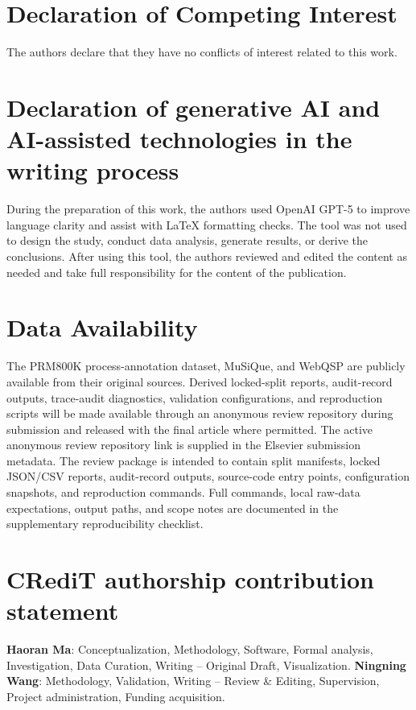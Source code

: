 \documentclass[a4paper,fleqn]{cas-sc}
\begin{document}
\section*{Declaration of Competing Interest}
The authors declare that they have no conflicts of interest related to this work.

\section*{Declaration of generative AI and AI-assisted technologies in the writing process}
During the preparation of this work, the authors used OpenAI GPT-5 to improve language clarity and assist with LaTeX formatting checks. The tool was not used to design the study, conduct data analysis, generate results, or derive the conclusions. After using this tool, the authors reviewed and edited the content as needed and take full responsibility for the content of the publication.

\section*{Data Availability}
The PRM800K process-annotation dataset, MuSiQue, and WebQSP are publicly available from their original sources. Derived locked-split reports, audit-record outputs, trace-audit diagnostics, validation configurations, and reproduction scripts will be made available through an anonymous review repository during submission and released with the final article where permitted. The active anonymous review repository link is supplied in the Elsevier submission metadata. The review package is intended to contain split manifests, locked JSON/CSV reports, audit-record outputs, source-code entry points, configuration snapshots, and reproduction commands. Full commands, local raw-data expectations, output paths, and scope notes are documented in the supplementary reproducibility checklist.

\section*{CRediT authorship contribution statement}
\textbf{Haoran Ma}: Conceptualization, Methodology, Software, Formal analysis, Investigation, Data Curation, Writing -- Original Draft, Visualization. \textbf{Ningning Wang}: Methodology, Validation, Writing -- Review \& Editing, Supervision, Project administration, Funding acquisition.

\clearpage
\appendix
\end{document}
